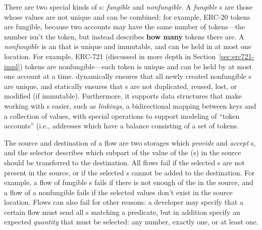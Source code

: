 \documentclass[dvipsnames, usenames, sigconf]{acmart}
\begin{document}
There are two special kinds of \assetTxt{}s: \emph{fungible} and \emph{nonfungible}.
A \emph{fungible} \assetTxt{}s are those whose values are not unique and can be combined: for example, ERC-20 tokens are fungible, because two accounts may have the same number of tokens---the number isn't the token, but instead describes \textbf{how many} tokens there are.
A \emph{nonfungible} \assetTxt is an \assetTxt that is unique and immutable, and can be held in at most one location.
For example, ERC-721  (discussed in more depth in Section~\ref{sec:erc721-impl}) tokens are nonfungible---each token is unique and can be held by at most one account at a time.
\langName dynamically ensures that all newly created nonfungible \assetTxt{}s are unique, and statically ensures that \assetTxt{}s are not duplicated, reused, lost, or modified (if immutable).
Furthermore, it supports data structures that make working with \assetTxt{}s easier, such as \emph{linkings}, a bidirectional mapping between keys and a collection of values, with special operations to support modeling of ``token accounts'' (i.e., addresses which have a balance consisting of a set of tokens.

The source and destination of a flow are two storages which \emph{provide} and \emph{accept} \assetTxt{}s, and the selector describes which subpart of the value of the \assetTxt{}(s) in the source should be transferred to the destination.
All flows fail if the selected \assetTxt{}s are not present in the source, or if the selected \assetTxt{}s cannot be added to the destination.
For example, a flow of fungible \assetTxt{}s fails if there is not enough of the \assetTxt in the source, and a flow of a nonfungible \assetTxt fails if the selected values don't exist in the source location.
Flows can also fail for other reasons: a developer may specify that a certain flow must send all \assetTxt{}s matching a predicate, but in addition specify an expected \emph{quantity} that must be selected: any number, exactly one, or at least one.
\end{document}
